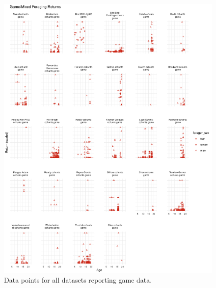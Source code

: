 \begin{figure}[h]
\centering
\includegraphics[width=12cm] {text/images/supplementary/game_data.pdf}
\renewcommand{\thefigure}{S\arabic{figure}}
\caption{Data points for all datasets reporting game data.}
\label{fig:game}
\end{figure}

